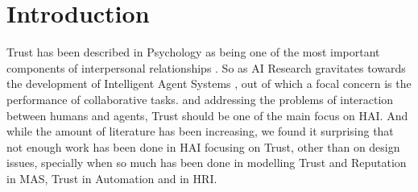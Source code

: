 \section{Introduction}
\label{sec:Introduction}

Trust has been described in Psychology as being one of the most important components of interpersonal relationships \cite{Simpson2007a}. So as \ac{AI} Research gravitates towards the development of Intelligent Agent Systems \cite{Russell2009a}, out of which a focal concern is the performance of collaborative tasks\cite{Grosz1996, Allen2002, Allen2007}. and addressing the problems of interaction between humans and agents\cite{Bradshaw2011}, Trust should be one of the main focus on \ac{HAI}. And while the amount of literature has been increasing, we found it surprising that not enough work has been done in \ac{HAI} focusing on Trust, other than on design issues\cite{Bickmore2005}, specially when so much has been done in modelling Trust and Reputation in \ac{MAS}\cite{Granatyr2015}, Trust in Automation \cite{Lee1992, Jones1997, Lee2004} and in \ac{HRI}\cite{Goodrich2007, VandenBrule2014}.




